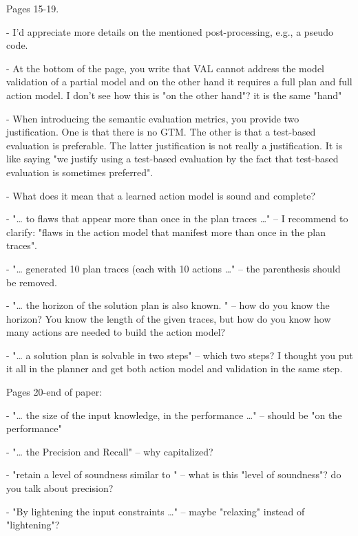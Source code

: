 \documentclass{article}
\begin{document}
\begin{mdframed}[hidealllines=true,backgroundcolor=gray!20]
Pages 15-19.

-          I'd appreciate more details on the mentioned post-processing, e.g., a pseudo code.

-          At the bottom of the page, you write that VAL cannot address the model validation of a partial model and on the other hand it requires a full plan and full action model. I don't see how this is "on the other hand"? it is the same "hand"

-          When introducing the semantic evaluation metrics, you provide two justification. One is that there is no GTM. The other is that a test-based evaluation is preferable. The latter justification is not really a justification. It is like saying "we justify using a test-based evaluation by the fact that test-based evaluation is sometimes preferred".

-          What does it mean that a learned action model is sound and complete? 

-          "… to flaws that appear more than once in the plan traces …" – I recommend to clarify: "flaws in the action model that manifest more than once in the plan traces".   

-          "… generated 10 plan traces (each with 10 actions …" – the parenthesis should be removed. 

-          "… the horizon of the solution plan is also known. " – how do you know the horizon? You know the length of the given traces, but how do you know how many actions are needed to build the action model? 

-          "… a solution plan is solvable in two steps" – which two steps? I thought you put it all in the planner and get both action model and validation in the same step.   
\end{mdframed}


\begin{mdframed}[hidealllines=true,backgroundcolor=gray!20]
   Pages 20-end of paper:

-          "… the size of the input knowledge, in the performance …" – should be "on the performance"

-          "… the Precision and Recall" – why capitalized?

-          "retain a level of soundness similar to " – what is this "level of soundness"? do you talk about precision? 

-          "By lightening the input constraints …" – maybe "relaxing" instead of "lightening"?
\end{mdframed}
\end{document}
